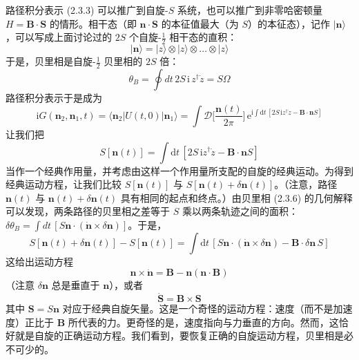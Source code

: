 路径积分表示 (2.3.3) 可以推广到自旋-$S$ 系统，也可以推广到非零哈密顿量 $H = \pmb{B}\cdot\pmb{S}$ 的情形。相干态（即 $\pmb{n}\cdot\pmb{S}$ 的本征值最大（为 $S$）的本征态），记作 $|\pmb{n}\rangle$，可以写成上面讨论过的 $2S$ 个自旋-$\frac{1}{2}$ 相干态的直积：
\begin{equation*}
|\pmb{n}\rangle = |z\rangle \otimes |z\rangle \otimes \dots \otimes |z\rangle
\end{equation*}
于是，贝里相是自旋-$\frac{1}{2}$ 贝里相的 $2S$ 倍：
\begin{equation*}
\theta_B = \oint dt\, 2S\,\mathrm{i}\, z^{\dagger}\dot{z} = S\Omega\tag{2.3.6}
\end{equation*}
路径积分表示于是成为
\begin{equation*}
\mathrm{i}G(\pmb{n}_2, \pmb{n}_1, t) = \langle \pmb{n}_2 | U(t,0) | \pmb{n}_1 \rangle = \int \mathcal{D}\Big[\frac{\pmb{n}(t)}{2\pi}\Big]\, \mathrm{e}^{\mathrm{i}\int \mathrm{d}t\, [2S\,\mathrm{i}z^{\dagger}\dot{z} - \pmb{B}\cdot\pmb{n}S]}\tag{2.3.7}
\end{equation*}
让我们把
\begin{equation*}
S[\pmb{n}(t)] = \int \mathrm{d}t\, [2S\,\mathrm{i}z^{\dagger}\dot{z} - \pmb{B}\cdot\pmb{n}S]\tag{2.3.8}
\end{equation*}
当作一个经典作用量，并考虑由这样一个作用量所支配的自旋的经典运动。为得到经典运动方程，让我们比较 $S[\pmb{n}(t)]$ 与 $S[\pmb{n}(t)+\delta\pmb{n}(t)]$。（注意，路径 $\pmb{n}(t)$ 与 $\pmb{n}(t)+\delta\pmb{n}(t)$ 具有相同的起点和终点。）由贝里相 (2.3.6) 的几何解释可以发现，两条路径的贝里相之差等于 $S$ 乘以两条轨迹之间的面积：$\delta\theta_B = \int dt\, [S\pmb{n}\cdot(\dot{\pmb{n}}\times\delta\pmb{n})]$。于是，
\begin{equation*}
S[\pmb{n}(t)+\delta\pmb{n}(t)] - S[\pmb{n}(t)] = \int \mathrm{d}t\, [S\pmb{n}\cdot(\dot{\pmb{n}}\times\delta\pmb{n}) - \pmb{B}\cdot\delta\pmb{n}\,S]
\end{equation*}
这给出运动方程
\begin{equation*}
\pmb{n}\times\dot{\pmb{n}} = \pmb{B} - \pmb{n}(\pmb{n}\cdot\pmb{B})
\end{equation*}
（注意 $\delta\pmb{n}$ 总是垂直于 $\pmb{n}$），或者
\begin{equation*}
\dot{\pmb{S}} = \pmb{B}\times\pmb{S}\tag{2.3.9}
\end{equation*}
其中 $\pmb{S} = S\pmb{n}$ 对应于经典自旋矢量。这是一个奇怪的运动方程：速度（而不是加速度）正比于 $\pmb{B}$ 所代表的力。更奇怪的是，速度指向与力垂直的方向。然而，这恰好就是自旋的正确运动方程。我们看到，要恢复正确的自旋运动方程，贝里相是必不可少的。

